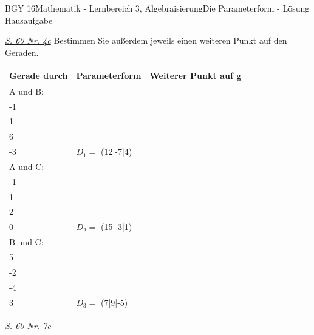 \documentclass[oneside,openany,headings=optiontotoc,11pt,numbers=noenddot]{scrreprt}
\begin{document}
\begin{worksheet}{BGY 16}{Mathematik - Lernbereich 3, Algebraisierung}{Die Parameterform - Lösung Hausaufgabe}
		\begin{framed}
			\noindent
			\underline{\textit{S. 60 Nr. 4c}} Bestimmen Sie außerdem jeweils einen weiteren Punkt auf den Geraden.\\
			\par\noindent
			\begin{tabularx}{\textwidth}{lXX}
				Gerade durch & Parameterform & Weiterer Punkt auf g\\
				\hline
				A und B:&\(g: \vec{x} = \left(\begin{array}{c}8\\-1\\1\end{array}\right) + r*\left(\begin{array}{c}-4\\6\\-3\end{array}\right)\) & \(D_1 =\) (12|-7|4)\\
				A und C:&\(g: \vec{x} = \left(\begin{array}{c}8\\-1\\1\end{array}\right) + r*\left(\begin{array}{c}-7\\2\\0\end{array}\right)\) & \(D_2 =\) (15|-3|1)\\
				B und C:&\(g: \vec{x} = \left(\begin{array}{c}4\\5\\-2\end{array}\right) + r*\left(\begin{array}{c}-3\\-4\\3\end{array}\right)\)& \(D_3 =\) (7|9|-5)\\
			\end{tabularx}
			\newpage\noindent		
			\underline{\textit{S. 60 Nr. 7c}}\\
			\par\noindent

\end{framed}
\end{worksheet}
\end{document}

